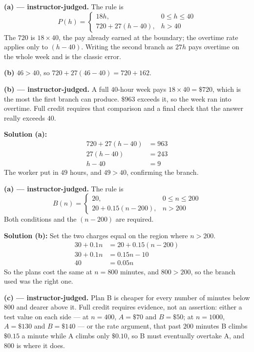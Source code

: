 \documentclass[12pt]{article}
\begin{document}
\textbf{(a) --- instructor-judged.} The rule is
\[ P(h) = \begin{cases} 18h, & 0 \le h \le 40 \\ 720 + 27(h-40), & h > 40 \end{cases} \]
The $720$ is $18 \times 40$, the pay already earned at the boundary; the overtime rate applies only to $(h-40)$. Writing the second branch as $27h$ pays overtime on the whole week and is the classic error.

\textbf{(b)} $46 > 40$, so $720 + 27(46-40) = 720 + 162$. 


\textbf{(b) --- instructor-judged.} A full $40$-hour week pays $18 \times 40 = \$720$, which is the most the first branch can produce. $\$963$ exceeds it, so the week ran into overtime. Full credit requires that comparison and a final check that the answer really exceeds $40$.

\textbf{Solution (a):}
\begin{align*}
  720 + 27(h-40) &= 963 \\
  27(h-40) &= 243 \\
  h - 40 &= 9
\end{align*}
The worker put in $49$ hours, and $49 > 40$, confirming the branch. 


\textbf{(a) --- instructor-judged.} The rule is
\[ B(n) = \begin{cases} 20, & 0 \le n \le 200 \\ 20 + 0.15(n-200), & n > 200 \end{cases} \]
Both conditions and the $(n-200)$ are required.

\textbf{Solution (b):} Set the two charges equal on the region where $n > 200$.
\begin{align*}
  30 + 0.1n &= 20 + 0.15(n-200) \\
  30 + 0.1n &= 0.15n - 10 \\
  40 &= 0.05n
\end{align*}
So the plans cost the same at $n = 800$ minutes, and $800 > 200$, so the branch used was the right one. 

\textbf{(c) --- instructor-judged.} Plan B is cheaper for every number of minutes below $800$ and dearer above it. Full credit requires evidence, not an assertion: either a test value on each side --- at $n = 400$, $A = \$70$ and $B = \$50$; at $n = 1000$, $A = \$130$ and $B = \$140$ --- or the rate argument, that past $200$ minutes B climbs $\$0.15$ a minute while A climbs only $\$0.10$, so B must eventually overtake A, and $800$ is where it does.
\end{document}

